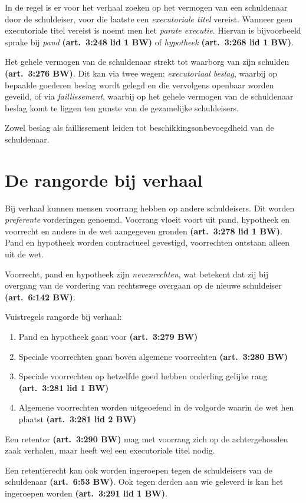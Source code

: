 \documentclass[a4paper]{article}
\newcommand{\art}[1]{\textbf{(art.~#1 BW)}\xspace}
\begin{document}
In de regel is er voor het verhaal zoeken op het vermogen van een schuldenaar
door de schuldeiser, voor die laatste een \emph{executoriale titel} vereist.
Wanneer geen executoriale titel vereist is noemt men het \emph{parate
executie}. Hiervan is bijvoorbeeld sprake bij \emph{pand} \art{3:248 lid 1} of
\emph{hypotheek} \art{3:268 lid 1}.

Het gehele vermogen van de schuldenaar strekt tot waarborg van zijn schulden
\art{3:276}. Dit kan via twee wegen: \emph{executoriaal beslag}, waarbij
op bepaalde goederen beslag wordt gelegd en die vervolgens openbaar worden
geveild, of via \emph{faillissement}, waarbij op het gehele vermogen van de
schuldenaar beslag komt te liggen ten gunste van de gezamelijke schuldeisers.

Zowel beslag als faillissement leiden tot beschikkingsonbevoegdheid van de
schuldenaar.

\section{De rangorde bij verhaal}

Bij verhaal kunnen mensen voorrang hebben op andere schuldeisers. Dit worden
\emph{preferente} vorderingen genoemd. Voorrang vloeit voort uit pand,
hypotheek en voorrecht en andere in de wet aangegeven gronden \art{3:278 lid
1}. Pand en hypotheek worden contractueel gevestigd, voorrechten ontstaan
alleen uit de wet.

Voorrecht, pand en hypotheek zijn \emph{nevenrechten}, wat betekent dat zij
bij overgang van de vordering van rechtswege overgaan op de nieuwe schuldeiser
\art{6:142}.

Vuistregels rangorde bij verhaal:
\begin{enumerate}
  \item Pand en hypotheek gaan voor \art{3:279}
  \item Speciale voorrechten gaan boven algemene voorrechten \art{3:280}
  \item Speciale voorrechten op hetzelfde goed hebben onderling gelijke rang
    \art{3:281 lid 1}
  \item Algemene voorrechten worden uitgeoefend in de volgorde waarin de wet
    hen plaatst \art{3:281 lid 2}
\end{enumerate}

Een retentor \art{3:290} mag met voorrang zich op de achtergehouden zaak
verhalen, maar heeft wel een executoriale titel nodig.

Een retentierecht kan ook worden ingeroepen tegen de schuldeisers van de
schuldenaar \art{6:53}. Ook tegen derden aan wie geleverd is kan het
ingeroepen worden \art{3:291 lid 1}.
\end{document}
